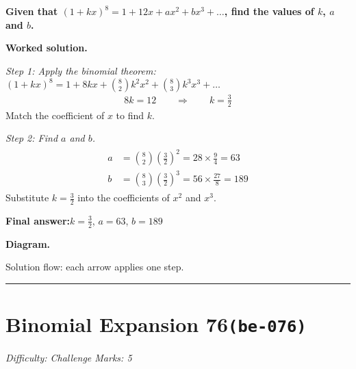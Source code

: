 \documentclass[11pt]{article}
\newcommand{\question}[1]{\par\medskip\noindent\textbf{#1}\par}
\begin{document}
\question{Given that \( (1 + kx)^8 = 1 + 12x + ax^2 + bx^3 + \ldots \), find the values of \( k \), \( a \) and \( b \).}

\textbf{Worked solution.}

\textit{Step 1: Apply the binomial theorem: \((1+kx)^8 = 1 + 8kx + \binom{8}{2}k^2x^2 + \binom{8}{3}k^3x^3 + \ldots\)}
\[\begin{gathered}
8k = 12 \quad\quad \Rightarrow \quad\quad k = \frac{3}{2}
\end{gathered}\]
Match the coefficient of \(x\) to find \(k\).

\textit{Step 2: Find \(a\) and \(b\).}
\[\begin{gathered}
\begin{aligned} a &= \binom{8}{2}\left(\frac{3}{2}\right)^2 = 28 \times \frac{9}{4} = 63 \\ b &= \binom{8}{3}\left(\frac{3}{2}\right)^3 = 56 \times \frac{27}{8} = 189 \end{aligned}
\end{gathered}\]
Substitute \(k = \frac{3}{2}\) into the coefficients of \(x^2\) and \(x^3\).

\begin{answerbox}
\textbf{Final answer:}\quad \(\displaystyle k = \frac{3}{2}\), \(\displaystyle a = 63\), \(\displaystyle b = 189\)
\end{answerbox}
\textbf{Diagram.}

\begin{center}
\end{center}
\small Solution flow: each arrow applies one step.\normalsize

\medskip\hrule

\section*{Binomial Expansion 76\quad\small\texttt{(be-076)}}
\textit{Difficulty: Challenge \quad\textbar\quad Marks: 5}
\end{document}
